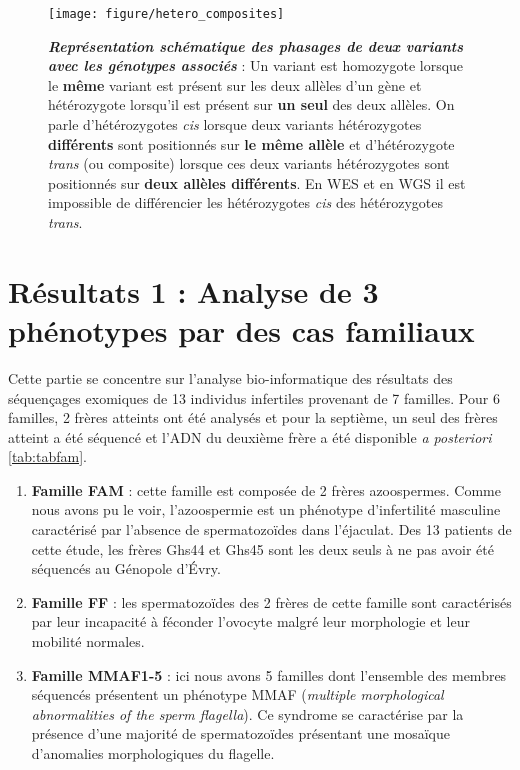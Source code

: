 \documentclass[12pt,a4paper,twoside]{ugathesis}
\begin{document}
\begin{figure}

{\centering \texttt{[image: figure/hetero\_composites]} 

}

\caption[Représentation schématique des phasages de deux variants avec les génotypes associés]{\textbf{\emph{Représentation schématique des
phasages de deux variants avec les génotypes associés}} : Un variant est
homozygote lorsque le \textbf{même} variant est présent sur les deux
allèles d'un gène et hétérozygote lorsqu'il est présent sur \textbf{un
seul} des deux allèles. On parle d'hétérozygotes \emph{cis} lorsque deux
variants hétérozygotes \textbf{différents} sont positionnés sur
\textbf{le même allèle} et d'hétérozygote \emph{trans} (ou composite)
lorsque ces deux variants hétérozygotes sont positionnés sur
\textbf{deux allèles différents}. En WES et en WGS il est impossible de
différencier les hétérozygotes \emph{cis} des hétérozygotes
\emph{trans}.}\label{fig:piccompositehet}
\end{figure}













\newpage

\section{Résultats 1 : Analyse de 3 phénotypes par des cas
familiaux}\label{resultats-1-analyse-de-3-phenotypes-par-des-cas-familiaux}

Cette partie se concentre sur l'analyse bio-informatique des résultats
des séquençages exomiques de 13 individus infertiles provenant de 7
familles. Pour 6 familles, 2 frères atteints ont été analysés et pour la
septième, un seul des frères atteint a été séquencé et l'ADN du deuxième
frère a été disponible \emph{a posteriori} \ref{tab:tabfam}.

\begin{enumerate}
\def\labelenumi{\arabic{enumi}.}
\item
  \textbf{Famille FAM} : cette famille est composée de 2 frères
  azoospermes. Comme nous avons pu le voir, l'azoospermie est un
  phénotype d'infertilité masculine caractérisé par l'absence de
  spermatozoïdes dans l'éjaculat. Des 13 patients de cette étude, les
  frères Ghs44 et Ghs45 sont les deux seuls à ne pas avoir été séquencés
  au Génopole d'Évry.
\item
  \textbf{Famille FF} : les spermatozoïdes des 2 frères de cette famille
  sont caractérisés par leur incapacité à féconder l'ovocyte malgré leur
  morphologie et leur mobilité normales.
\item
  \textbf{Famille MMAF1-5} : ici nous avons 5 familles dont l'ensemble
  des membres séquencés présentent un phénotype MMAF (\emph{multiple
  morphological abnormalities of the sperm flagella}). Ce syndrome se
  caractérise par la présence d'une majorité de spermatozoïdes
  présentant une mosaïque d'anomalies morphologiques du flagelle.
\end{enumerate}
\end{document}
